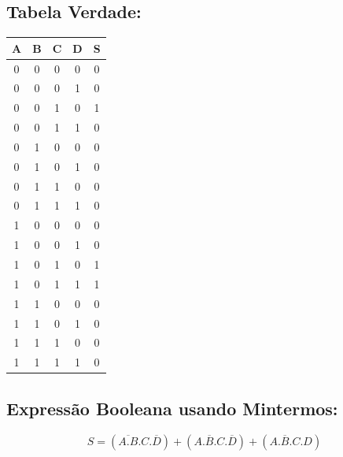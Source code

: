 \documentclass{article}
\begin{document}
		\subsection{Tabela Verdade:}
		\hspace*{5 cm}
		\begin{tabular}{|c|c|c|c|c|}
			\hline
			\textbf{ A } & \textbf{ B } & \textbf{ C } & \textbf{ D } & \textbf{ S } \\
			\hline
			0 & 0 & 0 & 0 & 0 \\
			\hline
			0 & 0 & 0 & 1 & 0 \\
			\hline
			0 & 0 & 1 & 0 & 1 \\
			\hline
			0 & 0 & 1 & 1 & 0 \\
			\hline
			0 & 1 & 0 & 0 & 0 \\
			\hline
			0 & 1 & 0 & 1 & 0 \\
			\hline
			0 & 1 & 1 & 0 & 0 \\
			\hline
			0 & 1 & 1 & 1 & 0 \\
			\hline
			1 & 0 & 0 & 0 & 0 \\
			\hline
			1 & 0 & 0 & 1 & 0 \\
			\hline
			1 & 0 & 1 & 0 & 1 \\
			\hline
			1 & 0 & 1 & 1 & 1 \\
			\hline
			1 & 1 & 0 & 0 & 0 \\
			\hline
			1 & 1 & 0 & 1 & 0 \\
			\hline
			1 & 1 & 1 & 0 & 0 \\
			\hline
			1 & 1 & 1 & 1 & 0 \\
			\hline
		\end{tabular}
		\subsection{Expressão Booleana usando Mintermos:}
			\begin{equation*}
				S = (\overline{A.B}.C.\overline{D})+(A.\overline{B}.C.\overline{D})+(A.\overline{B}.C.D)
			\end{equation*}
		
\end{document}
